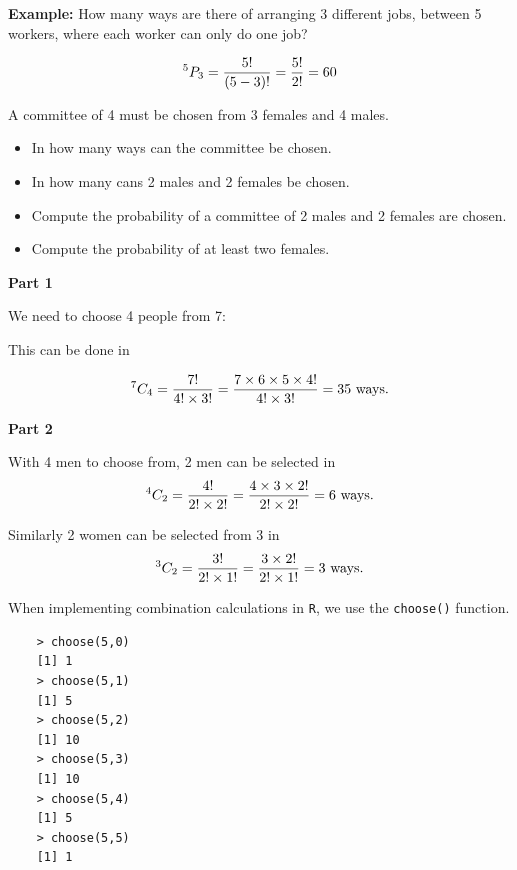 \documentclass[12pt]{report}
\begin{document}
{\Large
	\textbf{Example:}
	How many ways are there of arranging 3 different jobs, between 5 workers, where each worker can only do one job?
	
	
	\[ ^5 P_3 = \frac{5!}{(5-3)!}  = {5! \over 2!} = 60\]
	
}



{\Large
	
	A committee of 4 must be chosen from 3 females and 4 males.
	
	\begin{itemize}
		\item In how many ways can the committee be chosen.
		\item In how many cans 2 males and 2 females be chosen.
		\item Compute the probability of a committee of 2 males and 2 females are chosen.
		\item Compute the probability of at least two females.
	\end{itemize}
}


	
	\textbf{Part 1}
	
	We need to choose 4 people from 7:
	
	This can be done in
	
	\[
	^7 C_4  = {7!  \over 4! \times 3!} =  {7 \times 6 \times 5 \times 4!  \over 4! \times 3!} = 35 \mbox{ ways.}
	\]
	
	
	\textbf{Part 2}
	
	With 4 men to choose from, 2 men can be selected in \[
	^4 C_2  = {4!  \over 2! \times 2!} =  {4 \times 3 \times 2!  \over 2! \times 2!} = 6\mbox{ ways.}
	\]
	
	Similarly 2 women can be selected from 3 in
	\[
	^3 C_2  = {3!  \over 2! \times1!} =  {3 \times 2!  \over 2! \times 1!} = 3\mbox{ ways.}
	\]
	

When implementing combination calculations in \texttt{R}, we use the \texttt{choose()} function.
\begin{framed}	
	\begin{verbatim}
	> choose(5,0)
	[1] 1
	> choose(5,1)
	[1] 5
	> choose(5,2)
	[1] 10
	> choose(5,3)
	[1] 10
	> choose(5,4)
	[1] 5
	> choose(5,5)
	[1] 1
	\end{verbatim}
\end{framed}
	
\end{document}
